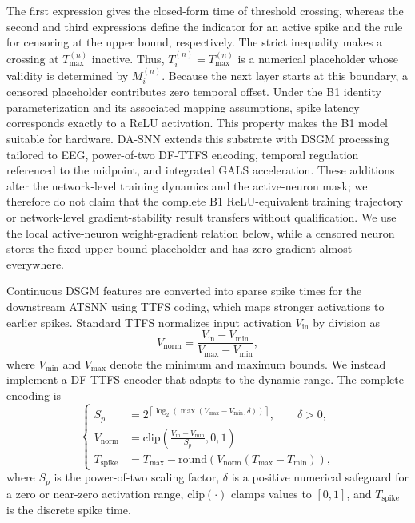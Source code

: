 ﻿\documentclass{nsr}
\begin{document}
The first expression gives the closed-form time of threshold crossing, whereas the second and third expressions define the indicator for an active spike and the rule for censoring at the upper bound, respectively. The strict inequality makes a crossing at $T_{\max}^{(n)}$ inactive. Thus, $T_i^{(n)}=T_{\max}^{(n)}$ is a numerical placeholder whose validity is determined by $M_i^{(n)}$. Because the next layer starts at this boundary, a censored placeholder contributes zero temporal offset. Under the B1 identity parameterization and its associated mapping assumptions, spike latency corresponds exactly to a ReLU activation. This property makes the B1 model suitable for hardware. DA-SNN extends this substrate with DSGM processing tailored to EEG, power-of-two DF-TTFS encoding, temporal regulation referenced to the midpoint, and integrated GALS acceleration. These additions alter the network-level training dynamics and the active-neuron mask; we therefore do not claim that the complete B1 ReLU-equivalent training trajectory or network-level gradient-stability result transfers without qualification. We use the local active-neuron weight-gradient relation below, while a censored neuron stores the fixed upper-bound placeholder and has zero gradient almost everywhere.

Continuous DSGM features are converted into sparse spike times for the downstream ATSNN using TTFS coding, which maps stronger activations to earlier spikes. Standard TTFS normalizes input activation $V_{\mathrm{in}}$ by division as
\begin{equation}
V_{\mathrm{norm}} = \frac{V_{\mathrm{in}} - V_{\min}}{V_{\max} - V_{\min}},
\label{eq:standard_ttfs}
\end{equation}
where $V_{\min}$ and $V_{\max}$ denote the minimum and maximum bounds. We instead implement a DF-TTFS encoder that adapts to the dynamic range. The complete encoding is
\begin{equation}
\left\{
\begin{aligned}
S_p &= 2^{\left\lceil \log_2\!\left(\max\!\left(V_{\max}-V_{\min},\delta\right)\right) \right\rceil}, \qquad \delta>0, \\
V_{\mathrm{norm}} &= \mathrm{clip}\left(\frac{V_{\mathrm{in}}-V_{\min}}{S_p}, 0, 1\right) \\
T_{\mathrm{spike}} &= T_{\max} - \mathrm{round}\left(V_{\mathrm{norm}} (T_{\max}-T_{\min})\right),
\end{aligned}
\right.
\label{eq:ttfs_div_free}
\end{equation}
where $S_p$ is the power-of-two scaling factor, $\delta$ is a positive numerical safeguard for a zero or near-zero activation range, $\mathrm{clip}(\cdot)$ clamps values to $[0,1]$, and $T_{\mathrm{spike}}$ is the discrete spike time.
\end{document}
